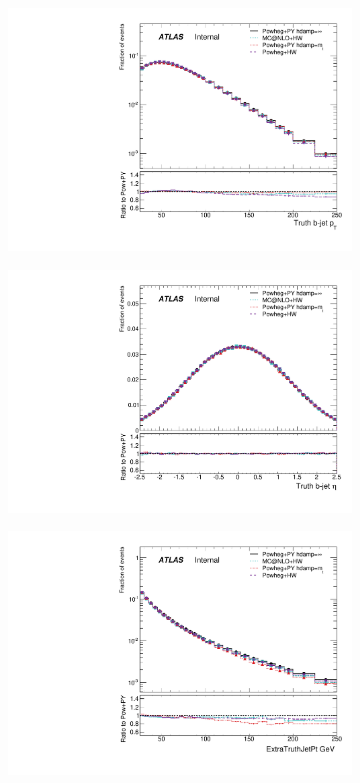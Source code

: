 \begin{figure}
\centering
\begin{subfigure}[]{0.45\textwidth}
\includegraphics[width=\textwidth]{fig/MCComp/TruthBJetPt.pdf}
\end{subfigure}
\begin{subfigure}[]{0.45\textwidth}
\includegraphics[width=\textwidth]{fig/MCComp/TruthBJetEta.pdf}
\end{subfigure}
\begin{subfigure}[]{0.45\textwidth}
\includegraphics[width=\textwidth]{fig/MCComp/ExtraTruthJetPt.pdf}

\end{subfigure}
\end{figure}
